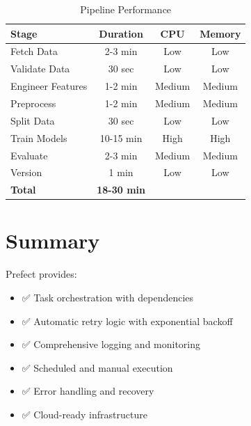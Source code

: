 \begin{table}[H]
\centering
\caption{Pipeline Performance}
\begin{tabularx}{\textwidth}{lccc}
\toprule
\textbf{Stage} & \textbf{Duration} & \textbf{CPU} & \textbf{Memory} \\
\midrule
Fetch Data & 2-3 min & Low & Low \\
Validate Data & 30 sec & Low & Low \\
Engineer Features & 1-2 min & Medium & Medium \\
Preprocess & 1-2 min & Medium & Medium \\
Split Data & 30 sec & Low & Low \\
Train Models & 10-15 min & High & High \\
Evaluate & 2-3 min & Medium & Medium \\
Version & 1 min & Low & Low \\
\midrule
\textbf{Total} & \textbf{18-30 min} & \textbf{} & \textbf{} \\
\bottomrule
\end{tabularx}
\end{table}

\section{Summary}

Prefect provides:
\begin{itemize}
    \item ✅ Task orchestration with dependencies
    \item ✅ Automatic retry logic with exponential backoff
    \item ✅ Comprehensive logging and monitoring
    \item ✅ Scheduled and manual execution
    \item ✅ Error handling and recovery
    \item ✅ Cloud-ready infrastructure
\end{itemize}

